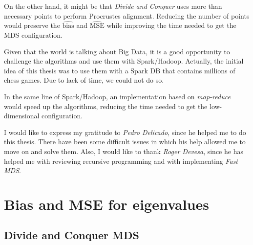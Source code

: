 \documentclass[11pt]{report}
\begin{document}
\indent On the other hand, it might be that \textit{Divide and Conquer} uses
more than necessary points to perform Procrustes alignment. Reducing the
number of points would preserve the $\widehat{\mbox{bias}}$ and 
$\widehat{\mbox{MSE}}$ while improving the time needed to get the 
MDS configuration.

\indent Given that the world is talking about Big Data, it is a good 
opportunity to challenge the algorithms and use them with Spark/Hadoop. 
Actually, the initial idea of this thesis was to use them with a Spark DB that 
contains millions of chess games. Due to lack of time, we could not do so. 

\indent In the same line of Spark/Hadoop, an implementation based on 
\textit{map-reduce} would speed up the algorithms, reducing the time needed
to get the low-dimensional configuration. \\


I would like to express my gratitude to \textit{Pedro Delicado}, since he helped
me to do this thesis. There have been some difficult issues in which his help
allowed me to move on and solve them. Also, I would like to thank
\textit{Roger Devesa}, since he has helped me with reviewing recursive 
programming and with implementing \textit{Fast MDS}.







\appendix 




\chapter{Bias and MSE for eigenvalues}
\section{Divide and Conquer MDS}
\label{chap:mes}
\end{document}
